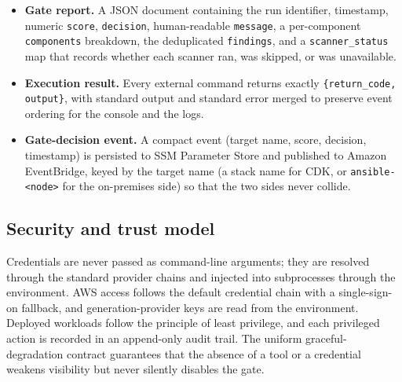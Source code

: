 \begin{itemize}
    \item \textbf{Gate report.} A JSON document containing the run identifier,
    timestamp, numeric \texttt{score}, \texttt{decision}, human-readable
    \texttt{message}, a per-component \texttt{components} breakdown, the deduplicated
    \texttt{findings}, and a \texttt{scanner\_status} map that records whether each
    scanner ran, was skipped, or was unavailable.
    \item \textbf{Execution result.} Every external command returns exactly
    \texttt{\{return\_code, output\}}, with standard output and standard error merged to
    preserve event ordering for the console and the logs.
    \item \textbf{Gate-decision event.} A compact event (target name, score, decision,
    timestamp) is persisted to SSM Parameter Store and published to Amazon EventBridge,
    keyed by the target name (a stack name for CDK, or \texttt{ansible-<node>} for the
    on-premises side) so that the two sides never collide.
\end{itemize}

\subsection{Security and trust model}
\label{subsec:arch-trust}

Credentials are never passed as command-line arguments; they are resolved through the
standard provider chains and injected into subprocesses through the environment. AWS
access follows the default credential chain with a single-sign-on fallback, and
generation-provider keys are read from the environment. Deployed workloads follow the
principle of least privilege, and each privileged action is recorded in an append-only
audit trail. The uniform graceful-degradation contract guarantees that the absence of a
tool or a credential weakens visibility but never silently disables the gate.
